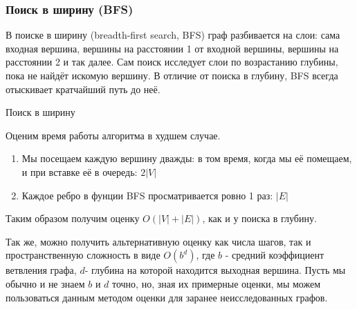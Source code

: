 \subsubsection{Поиск в ширину (BFS)} \label{BFS-algo}

В поиске в ширину (breadth-first search, BFS) граф разбивается на слои: сама входная вершина, вершины на расстоянии 1 от входной вершины, вершины на расстоянии 2 и так далее. Сам поиск исследует слои по возрастанию глубины, пока не найдёт искомую вершину. В отличие от поиска в глубину, BFS всегда отыскивает кратчайший путь до неё.

\begin{algorithm}[H]
\SetAlgoLined
{}

\caption{Поиск в ширину} \label{algo:BFS}
\end{algorithm}

Оценим время работы алгоритма в худшем случае.
\begin{enumerate}
    \item Мы посещаем каждую вершину дважды: в том время, когда мы её помещаем, и при вставке её в очередь: $2|V|$
    \item Каждое ребро в фунции BFS просматривается ровно 1 раз: $|E|$
\end{enumerate}

Таким образом получим оценку $O(|V| + |E|)$, как и у поиска в глубину.

Так же, можно получить альтернативную оценку как числа шагов, так и пространственную сложность в виде $O(b^{d})$, где $b$ - средний коэффициент ветвления графа, $d$- глубина на которой находится выходная вершина. Пусть мы обычно и не знаем $b$ и $d$ точно, но, зная их примерные оценки, мы можем пользоваться данным методом оценки для заранее неисследованных графов.

